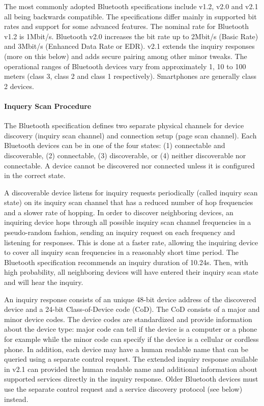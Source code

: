 The most commonly adopted Bluetooth specifications include v1.2, v2.0 and v2.1 all being backwards compatible. The specifications differ mainly in supported bit rates and support for some advanced features. The nominal rate for Bluetooth v1.2 is 1Mbit/s. Bluetooth v2.0 increases the bit rate up to 2Mbit/s (Basic Rate) and 3Mbit/s (Enhanced Data Rate or EDR). v2.1 extends the inquiry responses (more on this below) and adds secure pairing among other minor tweaks. The operational
ranges of Bluetooth devices vary from approximately 1, 10 to 100 meters (class 3, class 2 and class 1 respectively). Smartphones are generally class 2 devices.

\paragraph*{Inquery Scan Procedure}

The Bluetooth specification defines two separate physical channels for device discovery (inquiry scan channel) and connection setup (page scan channel). 
Each Bluetooth devices can be in one of the four states: (1) connectable and discoverable, (2) connectable, (3) discoverable, or (4) neither discoverable nor connectable. A device
cannot be discovered nor connected unless it is configured in the correct state.

A discoverable device listens for inquiry requests periodically (called inquiry scan state) on its inquiry scan channel that has a reduced number of hop frequencies and a
slower rate of hopping. In order to discover neighboring devices, an inquiring device hops through all possible inquiry scan channel frequencies in a pseudo-random
 fashion, sending an inquiry request on each frequency and listening for responses. This is done at a faster rate, allowing the inquiring device to cover all inquiry scan 
 frequencies in a reasonably short time period. The Bluetooth specification recommends an inquiry duration of 10.24s. Then, with high probability, all neighboring devices will
have entered their inquiry scan state and will hear the inquiry.

An inquiry response consists of an unique 48-bit device address of the discovered device and a 24-bit Class-of-Device code (CoD). The CoD consists of a major and 
minor device codes. The device codes are standardized and provide information about the device type: major code can tell if the device is a computer or a phone for 
example while the minor code can specify if the device is a cellular or cordless phone. In addition, each device may have a human readable name that can be queried using
a separate control request. The extended inquiry response available in v2.1 can provided the human readable name and additional information about supported services
directly in the inquiry response. Older Bluetooth devices must use the separate control request and a service discovery protocol (see below) instead.

